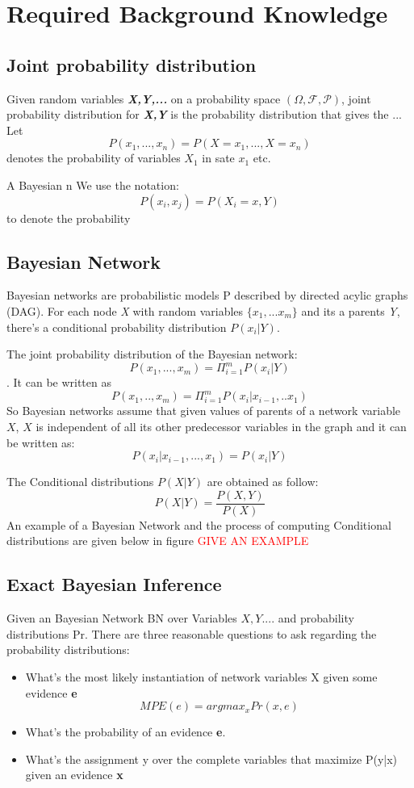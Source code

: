 \section{Required Background Knowledge}
    \subsection{Joint probability distribution}
    Given random variables \textbf{\textit{X,Y,...}} on a probability space $(\Omega, \mathcal{F}, \mathcal{P})$, joint probability distribution for \textbf{\textit{X,Y}} is the probability distribution that gives the ...
    Let $$P(x_{1}, ..., x_{n}) = P(X=x_{1}, ... , X = x_{n})$$ denotes the probability of variables $X_{1}$ in sate $x_{1}$ etc. \par
    A Bayesian n
    We use the notation: $$P(x_{i}, x_{j}) = P(X_{i} = x, Y)$$ to denote the probability
    \subsection{Bayesian Network}
    Bayesian networks are probabilistic models P described by directed acylic graphs (DAG). For each node \textit{X} with random variables $\{x_{1}, ... x_{m}\}$ and its a parents \textit{Y}, there's a conditional probability distribution $P(x_{i}|Y)$. \par
    The joint probability distribution of the Bayesian network: $$P(x_{1}, ... , x_{m}) = \Pi_{i = 1}^{m} P(x_{i}|Y)$$.
    It can be written as $$P(x_{1},.., x_{m}) = \Pi_{i = 1}^{m}P(x_{i}|x_{i - 1}, .. x_{1})$$
    So Bayesian networks assume that given values of parents of a network variable $X$, $X$ is independent of all its other predecessor variables in the graph and it can be written as: $$P(x_{i}|x_{i- 1}, ..., x_{1}) = P(x_{i}|Y)$$
    
    The Conditional distributions $P(X|Y)$ are obtained as follow:
    $$P(X|Y) = \frac{P(X,Y)}{P(X)}$$
    An example of a Bayesian Network and the process of computing Conditional distributions are given below in figure \textcolor{red}{GIVE AN EXAMPLE}
    \subsection{Exact Bayesian Inference}
    Given an Bayesian Network BN over Variables ${X, Y...}$. and probability distributions Pr. There are three reasonable questions to ask regarding the probability distributions:
    \begin{itemize}
        \item What's the most likely instantiation of network variables X given some evidence \textbf{e}
        $$MPE(e) = argmax_{x} Pr(x, e)$$
        \item What's the probability of an evidence \textbf{e}.
        \item What's the assignment y over the complete variables that maximize P(y|x) given an evidence \textbf{x}
    \end{itemize}
    
